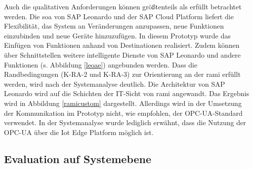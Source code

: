 Auch die qualitativen Anforderungen können größtenteils als erfüllt betrachtet werden. Die \ac{soa} von SAP Leonardo und der SAP Cloud Platform liefert die Flexibilität, das System an Veränderungen anzupassen, neue Funktionen einzubinden und neue Geräte hinzuzufügen. In diesem Prototyp wurde das Einfügen von Funktionen anhand von Destinationen realisiert. Zudem können über Schnittstellen weitere intelligente Dienste von SAP Leonardo und andere Funktionen (s. Abbildung \ref{leoae}) angebunden werden. Dass die Randbedingungen (K-RA-2 und K-RA-3) zur Orientierung an der \ac{rami} erfüllt werden, wird nach der Systemanalyse deutlich. Die Architektur von SAP Leonardo wird auf die Schichten der IT-Sicht von \ac{rami} angewandt. Das Ergebnis wird in Abbildung \ref{ramicustom} dargestellt. Allerdings wird in der Umsetzung der Kommunikation im Prototyp nicht, wie empfohlen, der OPC-UA-Standard verwendet. In der Systemanalyse wurde lediglich erwähnt, dass die Nutzung der OPC-UA über die Iot Edge Platform möglich ist.

\subsection{Evaluation auf Systemebene}

